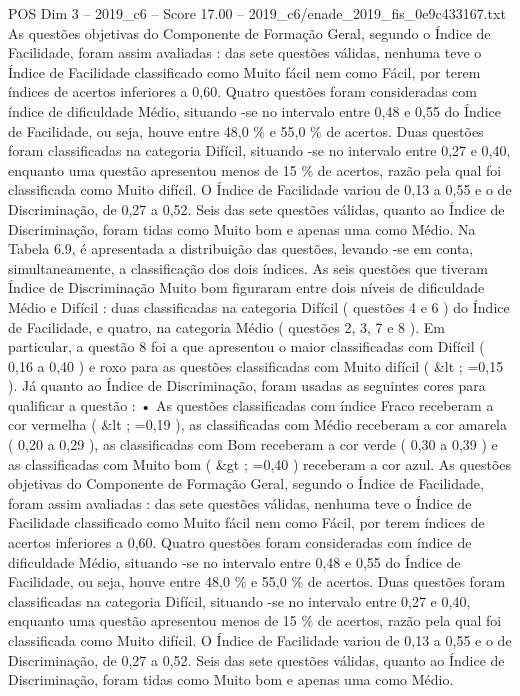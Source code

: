\begin{textsample}{POS Dim 3 – 2019\_c6 – Score 17.00 – 2019\_c6/enade\_2019\_fis\_0e9c433167.txt}
As questões objetivas do Componente de Formação Geral, segundo o Índice de Facilidade, foram assim avaliadas : das sete questões válidas, nenhuma teve o Índice de Facilidade classificado como Muito fácil nem como Fácil, por terem índices de acertos inferiores a 0,60.
Quatro questões foram consideradas com índice de dificuldade Médio, situando -se no intervalo entre 0,48 e 0,55 do Índice de Facilidade, ou seja, houve entre 48,0 \% e 55,0 \% de acertos.
Duas questões foram classificadas na categoria Difícil, situando -se no intervalo entre 0,27 e 0,40, enquanto uma questão apresentou menos de 15 \% de acertos, razão pela qual foi classificada como Muito difícil.
O Índice de Facilidade variou de 0,13 a 0,55 e o de Discriminação, de 0,27 a 0,52.
Seis das sete questões válidas, quanto ao Índice de Discriminação, foram tidas como Muito bom e apenas uma como Médio.
Na Tabela 6.9, é apresentada a distribuição das questões, levando -se em conta, simultaneamente, a classificação dos dois índices.
As seis questões que tiveram Índice de Discriminação Muito bom figuraram entre dois níveis de dificuldade Médio e Difícil : duas classificadas na categoria Difícil ( questões 4 e 6 ) do Índice de Facilidade, e quatro, na categoria Médio ( questões 2, 3, 7 e 8 ).
Em particular, a questão 8 foi a que apresentou o maior classificadas com Difícil ( 0,16 a 0,40 ) e roxo para as questões classificadas com Muito difícil ( \&lt ; =0,15 ).
Já quanto ao Índice de Discriminação, foram usadas as seguintes cores para qualificar a questão : • As questões classificadas com índice Fraco receberam a cor vermelha ( \&lt ; =0,19 ), as classificadas com Médio receberam a cor amarela ( 0,20 a 0,29 ), as classificadas com Bom receberam a cor verde ( 0,30 a 0,39 ) e as classificadas com Muito bom ( \&gt ; =0,40 ) receberam a cor azul.
As questões objetivas do Componente de Formação Geral, segundo o Índice de Facilidade, foram assim avaliadas : das sete questões válidas, nenhuma teve o Índice de Facilidade classificado como Muito fácil nem como Fácil, por terem índices de acertos inferiores a 0,60.
Quatro questões foram consideradas com índice de dificuldade Médio, situando -se no intervalo entre 0,48 e 0,55 do Índice de Facilidade, ou seja, houve entre 48,0 \% e 55,0 \% de acertos.
Duas questões foram classificadas na categoria Difícil, situando -se no intervalo entre 0,27 e 0,40, enquanto uma questão apresentou menos de 15 \% de acertos, razão pela qual foi classificada como Muito difícil.
O Índice de Facilidade variou de 0,13 a 0,55 e o de Discriminação, de 0,27 a 0,52.
Seis das sete questões válidas, quanto ao Índice de Discriminação, foram tidas como Muito bom e apenas uma como Médio.

\end{textsample}
